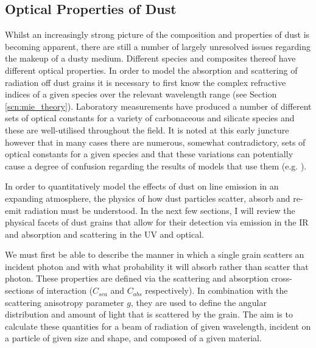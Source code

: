 \subsection{Optical Properties of Dust}
\label{opt_prop}
Whilst an increasingly strong picture of the composition and properties of dust is becoming apparent, there are still a number of largely unresolved issues regarding the makeup of a dusty medium.
Different species and composites thereof have different optical properties.  In order to model the absorption and scattering of radiation off dust grains it is necessary to first know the complex refractive indices of a given species over the relevant wavelength range (see Section \ref{scn:mie_theory}).  Laboratory measurements have produced a number of different sets of optical constants for a variety of carbonaceous and silicate species and these are well-utilised throughout the field.  It is noted at this early juncture however that in many cases there are numerous, somewhat contradictory, sets of optical constants for a given species and that these variations can potentially cause a degree of confusion regarding the results of models that use them (e.g. \citet{Owen2015}).  

In order to quantitatively model the effects of dust on line emission in an expanding atmosphere, the physics of how dust particles scatter, absorb and re-emit radiation must be understood. In the next few sections, I will review the physical facets of dust grains that allow for their detection via emission in the IR and absorption and scattering in the UV and optical.   

We must first be able to describe the manner in which a single grain scatters an incident photon and with what probability it will absorb rather than scatter that photon. These properties are defined via the scattering and absorption cross-sections of interaction ($C_{sca}$ and $C_{abs}$ respectively).  In combination with the scattering anisotropy parameter $g$, they are used to define the angular distribution and amount of  light that is scattered by the grain.  The aim is to calculate these quantities for a beam of radiation of given wavelength, incident on a particle of given size and shape, and composed of a given material.   

